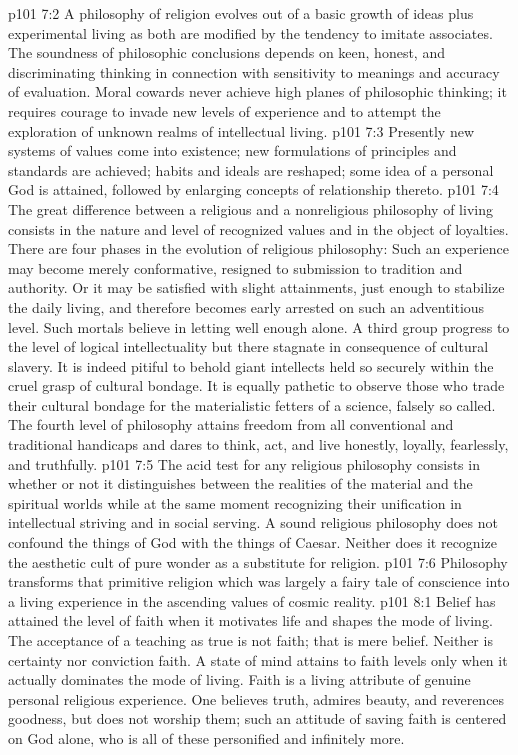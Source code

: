 \vs p101 7:2 A philosophy of religion evolves out of a basic growth of ideas plus experimental living as both are modified by the tendency to imitate associates. The soundness of philosophic conclusions depends on keen, honest, and discriminating thinking in connection with sensitivity to meanings and accuracy of evaluation. Moral cowards never achieve high planes of philosophic thinking; it requires courage to invade new levels of experience and to attempt the exploration of unknown realms of intellectual living.
\vs p101 7:3 Presently new systems of values come into existence; new formulations of principles and standards are achieved; habits and ideals are reshaped; some idea of a personal God is attained, followed by enlarging concepts of relationship thereto.
\vs p101 7:4 \pc The great difference between a religious and a nonreligious philosophy of living consists in the nature and level of recognized values and in the object of loyalties. There are four phases in the evolution of religious philosophy: Such an experience may become merely conformative, resigned to submission to tradition and authority. Or it may be satisfied with slight attainments, just enough to stabilize the daily living, and therefore becomes early arrested on such an adventitious level. Such mortals believe in letting well enough alone. A third group progress to the level of logical intellectuality but there stagnate in consequence of cultural slavery. It is indeed pitiful to behold giant intellects held so securely within the cruel grasp of cultural bondage. It is equally pathetic to observe those who trade their cultural bondage for the materialistic fetters of a science, falsely so called. The fourth level of philosophy attains freedom from all conventional and traditional handicaps and dares to think, act, and live honestly, loyally, fearlessly, and truthfully.
\vs p101 7:5 The acid test for any religious philosophy consists in whether or not it distinguishes between the realities of the material and the spiritual worlds while at the same moment recognizing their unification in intellectual striving and in social serving. A sound religious philosophy does not confound the things of God with the things of Caesar. Neither does it recognize the aesthetic cult of pure wonder as a substitute for religion.
\vs p101 7:6 Philosophy transforms that primitive religion which was largely a fairy tale of conscience into a living experience in the ascending values of cosmic reality.
\vs p101 8:1 Belief has attained the level of faith when it motivates life and shapes the mode of living. The acceptance of a teaching as true is not faith; that is mere belief. Neither is certainty nor conviction faith. A state of mind attains to faith levels only when it actually dominates the mode of living. Faith is a living attribute of genuine personal religious experience. One believes truth, admires beauty, and reverences goodness, but does not worship them; such an attitude of saving faith is centered on God alone, who is all of these personified and infinitely more.
